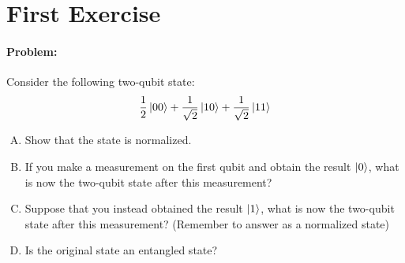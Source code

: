 \section{First Exercise}
\paragraph{Problem:} Consider the following two-qubit state:
\begin{equation*}
    \frac{1}{2} \ket{00} + \frac{1}{\sqrt{2}} \ket{10} + \frac{1}{\sqrt{2}} \ket{11}
\end{equation*}
\begin{enumerate}[A.]
    \item Show that the state is normalized.
    \item If you make a measurement on the first qubit and obtain the result $\ket{0}$, what is now the two-qubit state after this measurement?
    \item Suppose that you instead obtained the result $\ket{1}$, what is now the two-qubit state after this measurement? (Remember to answer as a normalized state)
    \item Is the original state an entangled state?
\end{enumerate}



